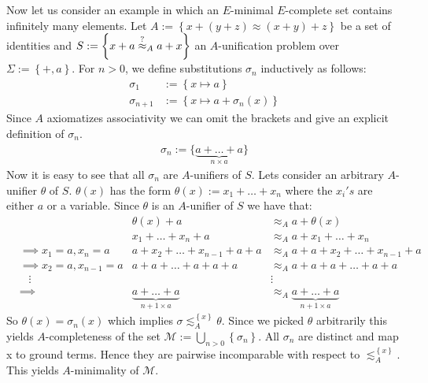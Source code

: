 Now let us consider an example in which an $E$-minimal $E$-complete set contains infinitely many elements. Let $A:=\left\lbrace x+(y+z)\approx (x+y)+z\right\rbrace $ be a set of identities and $S:=\left\lbrace x+a\stackrel{?}{\approx}_A a+x\right\rbrace$ an $A$-unification problem over $\Sigma:=\left\lbrace +,a\right\rbrace$. For $n>0$, we define substitutions $\sigma_n$ inductively as follows:
\begin{align*}
	\sigma_1     & :=\left\lbrace x\mapsto a\right\rbrace             \\
	\sigma_{n+1} & :=\left\lbrace x\mapsto a+\sigma_n(x)\right\rbrace 
\end{align*}
Since $A$ axiomatizes associativity we can omit the brackets and give an explicit definition of $\sigma_n$.
\begin{align*}
	\sigma_n:=\lbrace\underbrace{a+\dots+a}_{n\times a} \rbrace 
\end{align*}
Now it is easy to see that all $\sigma_n$ are $A$-unifiers of $S$.
Lets consider an arbitrary $A$-unifier $\theta$ of $S$. $\theta(x)$ has the form $\theta(x):=x_1+\dots+x_n$ where the $x_i's$ are either $a$ or a variable.
Since $\theta$ is an $A$-unifier of $S$ we have that:
\begin{align*}
	  &                          & \theta(x)+a                          & \approx_A a+\theta(x)                          \\
	  &                          & x_1+\dots+x_n+a                      & \approx_A a+x_1+\dots+x_n                      \\
	  & \implies x_1=a,x_n=a     & a+x_2+\dots+x_{n-1}+a+a              & \approx_A a+a+x_2+\dots+x_{n-1}+a              \\
	  & \implies x_2=a,x_{n-1}=a & a+a+\dots+a+a+a                      & \approx_A a+a+a+\dots+a+a                      \\
	  & \hspace{10pt}\vdots      &                                      & \vdots                                         \\
	  & \implies                 & \underbrace{a+\dots+a}_{n+1\times a} & \approx_A \underbrace{a+\dots+a}_{n+1\times a} 
\end{align*}
So $\theta(x)=\sigma_n(x)$ which implies $\sigma\lesssim^{\left\lbrace x\right\rbrace }_A\theta$.
Since we picked $\theta$ arbitrarily this yields $A$-completeness of the set $\mathcal{M}:=\bigcup_{n>0}\left\lbrace  \sigma_n\right\rbrace $.
All $\sigma_n$ are distinct and map x to ground terms. Hence they are pairwise incomparable with respect to $\lesssim^{\left\lbrace x\right\rbrace }_A$. This yields $A$-minimality of $\mathcal{M}$.
